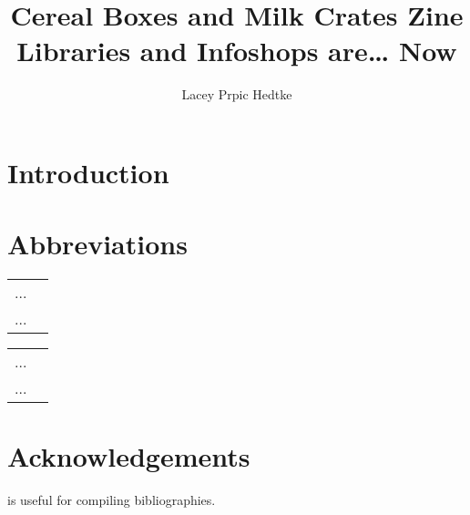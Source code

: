 \documentclass[output=paper]{langscibook}
\author{Lacey Prpic Hedtke}
\title{Cereal Boxes and Milk Crates Zine Libraries and Infoshops are… Now}
\begin{document}
\maketitle

\section{Introduction}
 
 
\section*{Abbreviations}
\begin{tabularx}{.45\textwidth}{lQ}
... & \\
... & \\
\end{tabularx}
\begin{tabularx}{.45\textwidth}{lQ}
... & \\
... & \\
\end{tabularx}


\section*{Acknowledgements}
\citet{Nordhoff2018} is useful for compiling bibliographies.

{\sloppy\printbibliography[heading=subbibliography,notkeyword=this]}
\end{document}
